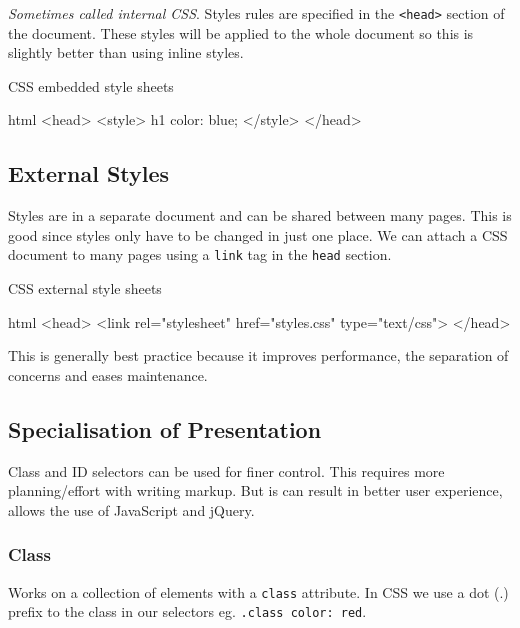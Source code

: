 \emph{Sometimes called internal CSS}.
Styles rules are specified in the \texttt{<head>} section of the document.
These styles will be applied to the whole document so this is slightly better than using inline styles.
\begin{highlight}{CSS embedded style sheets}
	\begin{code}{html}
		<head>
		<style>
            h1 {
                color: blue;
            }
		</style>
		</head>
	\end{code}
\end{highlight}

\subsection{External Styles}\label{sub:external_styles}

Styles are in a separate document and can be shared between many pages.
This is good since styles only have to be changed in just one place.
We can attach a CSS document to many pages using a \texttt{link} tag in the \texttt{head} section.
\begin{highlight}{CSS external style sheets}
    \begin{code}{html}
		<head>
            <link rel="stylesheet" href="styles.css" type="text/css">
		</head>
    \end{code}
\end{highlight}
This is generally best practice because it improves performance, the separation of concerns and eases maintenance.

\subsection{Specialisation of Presentation}\label{sub:specialisation_of_presentation}

Class and ID selectors can be used for finer control.
This requires more planning/effort with writing markup.
But is can result in better user experience, allows the use of JavaScript and jQuery.

\subsubsection{Class}\label{ssub:class}

Works on a collection of elements with a \texttt{class} attribute.
In CSS we use a dot (.) prefix to the class in our selectors eg. \texttt{.class {color: red}}.

